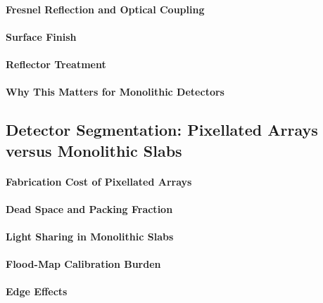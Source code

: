 \paragraph{Fresnel Reflection and Optical Coupling}

\paragraph{Surface Finish}

\paragraph{Reflector Treatment}

\paragraph{Why This Matters for Monolithic Detectors}

\subsection{Detector Segmentation: Pixellated Arrays versus Monolithic Slabs}
\label{sec:segmentation}

\paragraph{Fabrication Cost of Pixellated Arrays}

\paragraph{Dead Space and Packing Fraction}

\paragraph{Light Sharing in Monolithic Slabs}

\paragraph{Flood-Map Calibration Burden}

\paragraph{Edge Effects}

